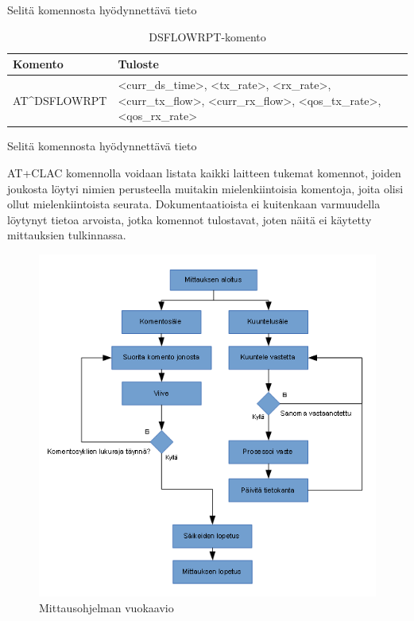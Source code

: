 \documentclass[11pt,a4paper,oneside,article,finnish]{memoir}
\begin{document}
Selitä komennosta hyödynnettävä tieto
\begin{table}[H]
	\centering
	\caption{DSFLOWRPT-komento}
	\begin{tabularx}{.95\textwidth}{|p{3cm}|X|}
		\hline
		Komento & Tuloste \\
    		\hline
		AT\^{}DSFLOWRPT & \textless curr\_ds\_time\textgreater , \textless tx\_rate\textgreater , \textless rx\_rate\textgreater , \textless curr\_tx\_flow\textgreater , \textless curr\_rx\_flow\textgreater , \textless qos\_tx\_rate\textgreater , \textless qos\_rx\_rate\textgreater \\
		\hline
	\end{tabularx}
	\label{table:atkomento_dsflowrpt}
\end{table}
Selitä komennosta hyödynnettävä tieto

AT+CLAC komennolla voidaan listata kaikki laitteen tukemat komennot, joiden joukosta löytyi nimien perusteella muitakin mielenkiintoisia komentoja, joita olisi ollut mielenkiintoista seurata. Dokumentaatioista ei kuitenkaan varmuudella löytynyt tietoa arvoista, jotka komennot tulostavat, joten näitä ei käytetty mittauksien tulkinnassa.

\begin{figure}[H]
	\centering
	\includegraphics{mittausohjelma_flowchart}
	\caption{Mittausohjelman vuokaavio}
	\label{fig:mittausohjelma_flowchart}
\end{figure}
\end{document}
